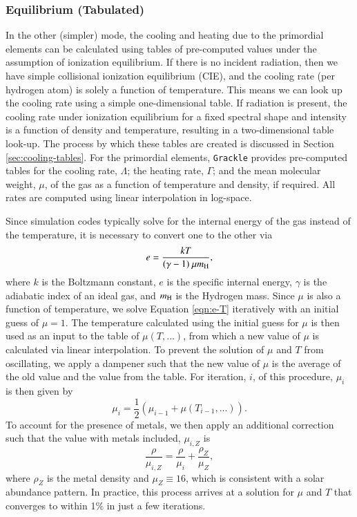 \subsubsection{Equilibrium (Tabulated)} \label{sec:pri-tab}

In the other (simpler) mode, the cooling and heating due to the primordial
elements can be calculated using tables of pre-computed values under
the assumption of ionization equilibrium.  If there is
no incident radiation, then we have simple collisional ionization
equilibrium (CIE), and the cooling rate (per hydrogen atom) is solely a function of
temperature.  This means we can look up the cooling rate using a simple
one-dimensional table.   If radiation is present, the cooling rate under
ionization equilibrium for a fixed spectral shape and intensity is a
function of density and temperature, resulting in a two-dimensional table
look-up.  The process by which these tables are
created is discussed in Section \ref{sec:cooling-tables}.  For the
primordial elements, \texttt{Grackle} provides pre-computed tables for the cooling rate, $\Lambda$;
the heating rate, $\Gamma$; and the mean molecular weight, $\mu$, of
the gas as a function of temperature and density, if required.  All rates
are computed using linear interpolation in log-space.

Since simulation codes typically solve for the internal energy of the gas
instead of the temperature, it is necessary to convert one to the
other via
\begin{equation} \label{eqn:e-T}
e = \frac{k T}{(\gamma - 1)\ \mu m_{\rm H}},
\end{equation}
where $k$ is the Boltzmann constant, $e$ is
the specific internal energy, $\gamma$ is the adiabatic index of an
ideal gas, and $m_{\rm H}$ is the Hydrogen mass.  Since $\mu$ is also a
function of temperature, we solve Equation \ref{eqn:e-T} iteratively
with an initial guess of $\mu = 1$.  The temperature calculated using
the initial guess for $\mu$ is then used as an input to the table of
$\mu(T,...)$, from which a new value of $\mu$ is calculated via
linear interpolation.  To prevent the solution of $\mu$ and $T$ from
oscillating, we apply a dampener such that the new value of $\mu$ is
the average of the old value and the value from the table.  For
iteration, $i$, of this procedure, $\mu_{i}$ is then given by
\begin{equation}
\mu_{i} = \frac{1}{2} (\mu_{i-1} + \mu(T_{i-1},...)).
\end{equation}
To account for the presence of metals, we then apply an additional
correction such that the value with metals included, $\mu_{i, Z}$ is
\begin{equation}
\frac{\rho}{\mu_{i, Z}} = \frac{\rho}{\mu_{i}} +
\frac{\rho_{Z}}{\mu_{Z}},
\end{equation}
where $\rho_{Z}$ is the metal density and $\mu_{Z} \equiv 16$, which
is consistent with a solar abundance pattern.  In practice, this
process arrives at a solution for $\mu$ and $T$ that converges to
within 1\% in just a few iterations.

